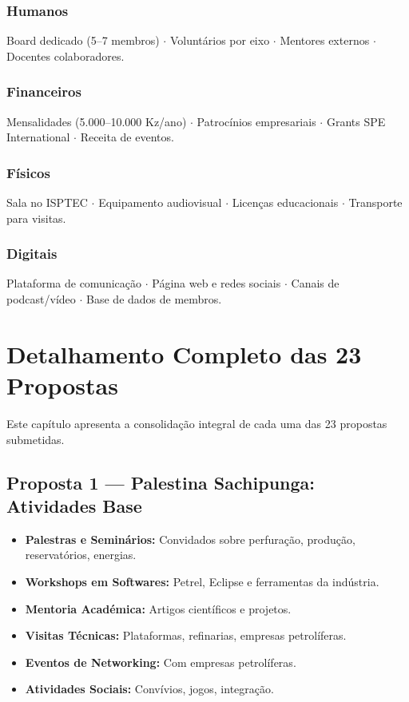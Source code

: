\documentclass[12pt,a4paper]{article}
\begin{document}
\subsubsection*{Humanos}
Board dedicado (5–7 membros) $\cdot$ Voluntários por eixo $\cdot$ Mentores externos $\cdot$ Docentes colaboradores.

\subsubsection*{Financeiros}
Mensalidades (5.000–10.000 Kz/ano) $\cdot$ Patrocínios empresariais $\cdot$ Grants SPE International $\cdot$ Receita de eventos.

\subsubsection*{Físicos}
Sala no ISPTEC $\cdot$ Equipamento audiovisual $\cdot$ Licenças educacionais $\cdot$ Transporte para visitas.

\subsubsection*{Digitais}
Plataforma de comunicação $\cdot$ Página web e redes sociais $\cdot$ Canais de podcast/vídeo $\cdot$ Base de dados de membros.

\newpage
\section{Detalhamento Completo das 23 Propostas}

Este capítulo apresenta a consolidação integral de cada uma das 23 propostas submetidas.

\subsection{Proposta 1 — Palestina Sachipunga: Atividades Base}

\begin{itemize}
    \item \textbf{Palestras e Seminários:} Convidados sobre perfuração, produção, reservatórios, energias.
    \item \textbf{Workshops em Softwares:} Petrel, Eclipse e ferramentas da indústria.
    \item \textbf{Mentoria Académica:} Artigos científicos e projetos.
    \item \textbf{Visitas Técnicas:} Plataformas, refinarias, empresas petrolíferas.
    \item \textbf{Eventos de Networking:} Com empresas petrolíferas.
    \item \textbf{Atividades Sociais:} Convívios, jogos, integração.
\end{itemize}
\end{document}
